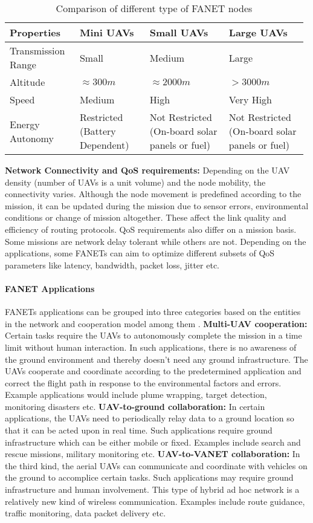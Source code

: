 \begin{table}
\caption{Comparison of different type of FANET nodes}
\label{tab:uav_comparison}
\begin{tabular}{|p{0.23\linewidth}|p{0.23\linewidth}|p{0.26\linewidth}|p{0.26\linewidth}|}
\toprule
Properties & Mini UAVs & Small UAVs & Large UAVs\\
\midrule
Transmission Range & Small & Medium & Large\\
\midrule
Altitude 	& $ \approx 300 m$ & $ \approx 2000 m$ & $> 3000 m$ \\
\midrule
Speed & Medium & High & Very High \\
\midrule
Energy Autonomy & Restricted (Battery Dependent) & Not Restricted (On-board solar panels or fuel) &  Not Restricted (On-board solar panels or fuel) \\
\bottomrule
\end{tabular}
\end{table}

\textbf{Network Connectivity and QoS requirements:} Depending on the UAV density (number of UAVs is a unit volume) and the node mobility, the connectivity varies. Although the node movement is predefined according to the mission, it can be updated during the mission due to sensor errors, environmental conditions or change of mission altogether. These affect the link quality and efficiency of routing protocols. QoS requirements also differ on a mission basis. Some missions are network delay tolerant while others are not. Depending on the applications, some FANETs can aim to optimize different subsets of QoS parameters like latency, bandwidth, packet loss, jitter etc.

\paragraph{FANET Applications}
FANETs applications can be grouped into three categories based on the entities in the network and cooperation model among them \cite{BEKMEZCI20131254}.
\textbf{Multi-UAV cooperation:} Certain tasks require the UAVs to autonomously complete the mission in a time limit without human interaction. In such applications, there is no awareness of the ground environment and thereby doesn’t need any ground infrastructure. The UAVs cooperate and coordinate according to the predetermined application and correct the flight path in response to the environmental factors and errors. Example applications would include plume wrapping, target detection, monitoring disasters etc.
\textbf{UAV-to-ground collaboration:} In certain applications, the UAVs need to periodically relay data to a ground location so that it can be acted upon in real time. Such applications require ground infrastructure which can be either mobile or fixed. Examples include search and rescue missions, military monitoring etc.
\textbf{UAV-to-VANET collaboration:} In the third kind, the aerial UAVs can communicate and coordinate with vehicles on the ground to accomplice certain tasks. Such applications may require ground infrastructure and human involvement. This type of hybrid ad hoc network is a relatively new kind of wireless communication. Examples include route guidance, traffic monitoring, data packet delivery etc.

